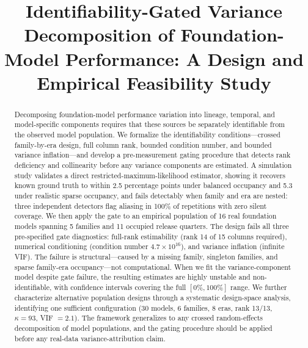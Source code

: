 \documentclass[journal]{IEEEtran}
\begin{document}
\title{Identifiability-Gated Variance Decomposition of Foundation-Model Performance: A Design and Empirical Feasibility Study}

\author{
}

\maketitle

\begin{abstract}
Decomposing foundation-model performance variation into lineage, temporal, and model-specific components requires that these sources be separately identifiable from the observed model population. We formalize the identifiability conditions---crossed family-by-era design, full column rank, bounded condition number, and bounded variance inflation---and develop a pre-measurement gating procedure that detects rank deficiency and collinearity before any variance components are estimated. A simulation study validates a direct restricted-maximum-likelihood estimator, showing it recovers known ground truth to within 2.5 percentage points under balanced occupancy and 5.3 under realistic sparse occupancy, and fails detectably when family and era are nested: three independent detectors flag aliasing in 100\% of repetitions with zero silent coverage. We then apply the gate to an empirical population of 16 real foundation models spanning 5 families and 11 occupied release quarters. The design fails all three pre-specified gate diagnostics: full-rank estimability (rank 14 of 15 columns required), numerical conditioning (condition number $4.7 \times 10^{16}$), and variance inflation (infinite VIF). The failure is structural---caused by a missing family, singleton families, and sparse family-era occupancy---not computational. When we fit the variance-component model despite gate failure, the resulting estimates are highly unstable and non-identifiable, with confidence intervals covering the full $[0\%, 100\%]$ range. We further characterize alternative population designs through a systematic design-space analysis, identifying one sufficient configuration (30 models, 6 families, 8 eras, rank 13/13, $\kappa = 93$, VIF $= 2.1$). The framework generalizes to any crossed random-effects decomposition of model populations, and the gating procedure should be applied before any real-data variance-attribution claim.
\end{abstract}
\end{document}
